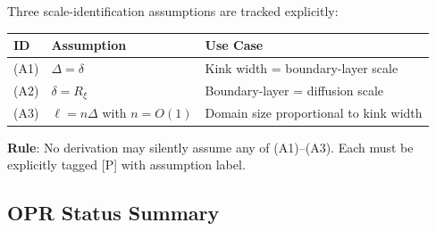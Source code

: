 Three scale-identification assumptions are tracked explicitly:

\begin{center}
\begin{tabular}{@{}lll@{}}
\toprule
ID & Assumption & Use Case \\
\midrule
(A1) & $\Delta = \delta$ & Kink width = boundary-layer scale \\
(A2) & $\delta = R_\xi$ & Boundary-layer = diffusion scale \\
(A3) & $\ell = n\Delta$ with $n = O(1)$ & Domain size proportional to kink width \\
\bottomrule
\end{tabular}
\end{center}

\textbf{Rule}: No derivation may silently assume any of (A1)--(A3). Each must be
explicitly tagged [P] with assumption label.

\subsection*{OPR Status Summary}

